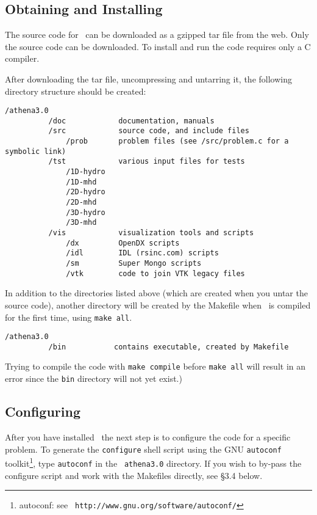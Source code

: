 \subsection{Obtaining and Installing \ath}

The source code for \ath\ can be downloaded as a gzipped tar file from the
web.  Only the source code can be downloaded.  To install and run the code
requires only a C compiler.

After downloading the tar file, uncompressing and untarring it,
the following directory structure should be created:

\begin{verbatim}
/athena3.0
          /doc            documentation, manuals
          /src            source code, and include files
              /prob       problem files (see /src/problem.c for a symbolic link)
          /tst            various input files for tests
              /1D-hydro
              /1D-mhd
              /2D-hydro
              /2D-mhd
              /3D-hydro
              /3D-mhd
          /vis            visualization tools and scripts
              /dx         OpenDX scripts
              /idl        IDL (rsinc.com) scripts
              /sm         Super Mongo scripts
              /vtk        code to join VTK legacy files
\end{verbatim}
In addition to the directories listed above (which are created when you
untar the source code), another directory will be created by the Makefile
when \ath\ is compiled for the first time, using {\tt make all}.

\begin{verbatim}
/athena3.0
          /bin           contains executable, created by Makefile
\end{verbatim}

Trying to compile the code with {\tt make compile} before
{\tt make all} will result in an error since the {\tt bin} directory will
not yet exist.)

\subsection{Configuring \ath}

After you have installed \ath\, the next step is to configure the
code for a specific problem.  To generate the {\tt configure} shell
script using the GNU {\tt autoconf} toolkit\footnote{autoconf: see {\tt
http://www.gnu.org/software/autoconf/}}, type {\tt autoconf} in the {\tt
athena3.0} directory.  If you wish to by-pass the configure script and work
with the Makefiles directly, see \S 3.4 below.

